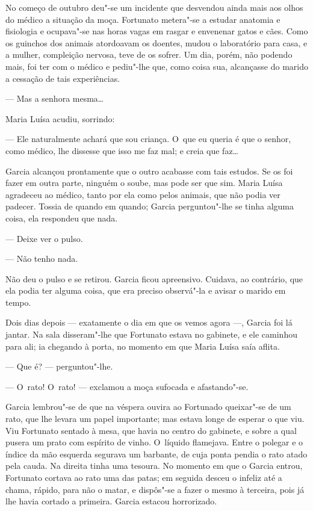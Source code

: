\begin{linenumbers}
No começo de outubro deu"-se um incidente que desvendou ainda mais aos
olhos do médico a situação da moça. Fortunato metera"-se a estudar
anatomia e fisiologia e ocupava"-se nas horas vagas em rasgar e envenenar
gatos e cães. Como os guinchos dos animais atordoavam os doentes, mudou
o laboratório para casa, e a mulher, compleição nervosa, teve de os
sofrer. Um dia, porém, não podendo mais, foi ter com o médico e
pediu"-lhe que, como coisa sua, alcançasse do marido a cessação de tais
experiências.

--- Mas a senhora mesma\ldots{}

Maria Luísa acudiu, sorrindo:

--- Ele naturalmente achará que sou criança. O~que eu queria é que o
senhor, como médico, lhe dissesse que isso me faz mal; e creia que
faz\ldots{}

Garcia alcançou prontamente que o outro acabasse com tais estudos. Se os
foi fazer em outra parte, ninguém o soube, mas pode ser que sim. Maria
Luísa agradeceu ao médico, tanto por ela como pelos animais, que não
podia ver padecer. Tossia de quando em quando; Garcia perguntou"-lhe se
tinha alguma coisa, ela respondeu que nada.

--- Deixe ver o pulso.

--- Não tenho nada.

Não deu o pulso e se retirou. Garcia ficou apreensivo. Cuidava, ao
contrário, que ela podia ter alguma coisa, que era preciso observá"-la e
avisar o marido em tempo.

Dois dias depois --- exatamente o dia em que os vemos agora ---, Garcia
foi lá jantar. Na sala disseram"-lhe que Fortunato estava no gabinete, e
ele caminhou para ali; ia chegando à porta, no momento em que Maria
Luísa saía aflita.

--- Que é? --- perguntou"-lhe.

--- O~rato! O~rato! --- exclamou a moça sufocada e afastando"-se.

Garcia lembrou"-se de que na véspera ouvira ao Fortunado queixar"-se de um
rato, que lhe levara um papel importante; mas estava longe de esperar o
que viu. Viu Fortunato sentado à mesa, que havia no centro do gabinete,
e sobre a qual pusera um prato com espírito de vinho. O~líquido
flamejava. Entre o polegar e o índice da mão esquerda segurava um
barbante, de cuja ponta pendia o rato atado pela cauda. Na direita tinha
uma tesoura. No momento em que o Garcia entrou, Fortunato cortava ao
rato uma das patas; em seguida desceu o infeliz até a chama, rápido,
para não o matar, e dispôs"-se a fazer o mesmo à terceira, pois já lhe
havia cortado a primeira. Garcia estacou horrorizado.


\end{linenumbers}
